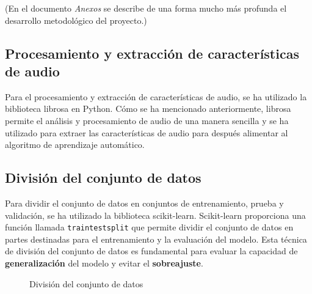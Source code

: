 (En el documento \textit{Anexos} se describe de una forma mucho más profunda el desarrollo metodológico del proyecto.)

\subsection{Procesamiento y extracción de características de audio}

Para el procesamiento y extracción de características de audio, se ha utilizado la biblioteca librosa en Python. Cómo se ha mencionado anteriormente, librosa permite el análisis y procesamiento de audio de una manera sencilla y se ha utilizado para extraer las características de audio para después alimentar al algoritmo de aprendizaje automático.

\subsection{División del conjunto de datos}

Para dividir el conjunto de datos en conjuntos de entrenamiento, prueba y validación, se ha utilizado la biblioteca scikit-learn. 
Scikit-learn proporciona una función llamada \texttt{train\textunderscore test\textunderscore split} que permite dividir el conjunto de datos en partes destinadas para el entrenamiento y la evaluación del modelo.
Esta técnica de división del conjunto de datos es fundamental para evaluar la capacidad de \textbf{generalización} del modelo y evitar el \textbf{sobreajuste}.

\begin{figure}
  \centering
  \caption{División del conjunto de datos}
\end{figure}

